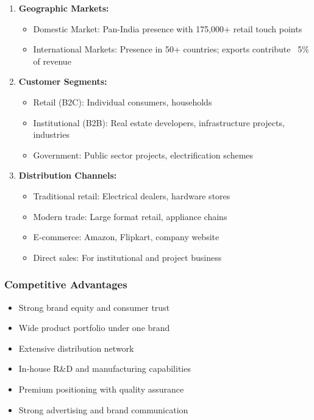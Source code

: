 \documentclass[12pt,a4paper]{article}
\begin{document}
\begin{enumerate}[leftmargin=*]
    \item \textbf{Geographic Markets:}
    \begin{itemize}
        \item Domestic Market: Pan-India presence with 175,000+ retail touch points
        \item International Markets: Presence in 50+ countries; exports contribute ~5\% of revenue
    \end{itemize}
    
    \item \textbf{Customer Segments:}
    \begin{itemize}
        \item Retail (B2C): Individual consumers, households
        \item Institutional (B2B): Real estate developers, infrastructure projects, industries
        \item Government: Public sector projects, electrification schemes
    \end{itemize}
    
    \item \textbf{Distribution Channels:}
    \begin{itemize}
        \item Traditional retail: Electrical dealers, hardware stores
        \item Modern trade: Large format retail, appliance chains
        \item E-commerce: Amazon, Flipkart, company website
        \item Direct sales: For institutional and project business
    \end{itemize}
\end{enumerate}

\subsubsection{Competitive Advantages}

\begin{itemize}[leftmargin=*]
    \item Strong brand equity and consumer trust
    \item Wide product portfolio under one brand
    \item Extensive distribution network
    \item In-house R\&D and manufacturing capabilities
    \item Premium positioning with quality assurance
    \item Strong advertising and brand communication
\end{itemize}
\end{document}
